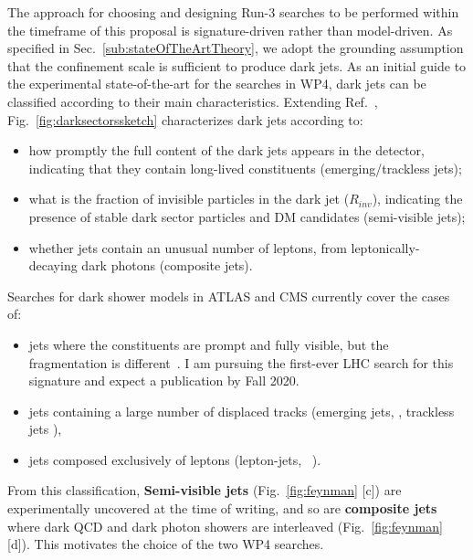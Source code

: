 The approach for choosing and designing Run-3 searches to be performed within the timeframe of this proposal is signature-driven rather than model-driven. 
As specified in Sec.~\ref{sub:stateOfTheArtTheory}, we adopt the grounding assumption that the confinement scale is sufficient to produce dark jets. 
As an initial guide to the experimental state-of-the-art for the searches in WP4, dark jets can be classified according to their main characteristics. 
Extending Ref.~\cite{Cohen:2017pzm, Park:2017rfb}, Fig.~\ref{fig:darksectorssketch} characterizes dark jets according to: 
\begin{itemize}
\item how promptly the full content of the dark jets appears in the detector, indicating that they contain long-lived constituents (emerging/trackless jets);
\item what is the fraction of invisible particles in the dark jet ($R_{inv}$), indicating the presence of stable dark sector particles and DM candidates (semi-visible jets);
\item whether jets contain an unusual number of leptons, from leptonically-decaying dark photons (composite jets).
\end{itemize}

Searches for dark shower models in ATLAS and CMS currently cover the cases of:
\begin{itemize}
\item jets where the constituents are prompt and fully visible, but the fragmentation is different~\cite{Park:2017rfb}. I am pursuing the first-ever LHC search for this signature and expect a publication by Fall 2020. 
\item jets containing a large number of displaced tracks (emerging jets, \cite{ToBeCited}, trackless jets \cite{ToBeCited}),%
\item jets composed exclusively of leptons (lepton-jets, ~\cite{ToBeCited}).%
\end{itemize} 


From this classification, \textbf{Semi-visible jets}  (Fig.~\ref{fig:feynman} [c]) are experimentally uncovered at the time of writing, 
and so are \textbf{composite jets} where dark QCD and dark photon showers are interleaved (Fig.~\ref{fig:feynman} [d]). This motivates the choice of the two WP4 searches. 

